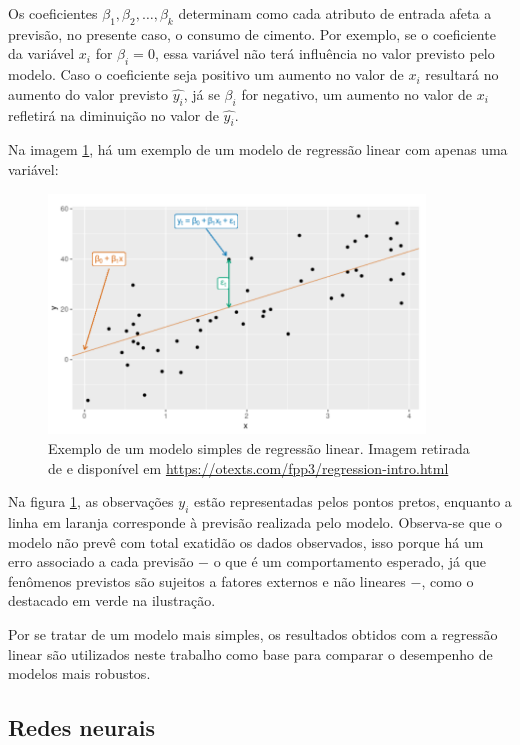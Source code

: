 Os coeficientes $\beta_1, \beta_2, \dots, \beta_k$ 
determinam como cada atributo de entrada afeta a previsão, no presente caso, o consumo de cimento.
Por exemplo, se o coeficiente da variável $x_i$ for $\beta_i = 0$,
essa variável não terá influência no valor previsto pelo modelo. 
Caso o coeficiente seja positivo um aumento 
no valor de $x_i$ resultará no aumento do valor previsto $\hat{y_i}$,
já se $\beta_i$ for negativo, um aumento no valor de $x_i$  refletirá na 
diminuição no valor de $\hat{y_i}$. 


Na imagem \ref{fig:reg_lin}, há um exemplo de um modelo de regressão 
linear com apenas uma variável:

\begin{figure}[H] 
  \includegraphics[width= 10cm]{../figuras/reg_lin.png}
  \caption{Exemplo de um modelo simples de regressão linear. Imagem retirada de \citet{forecasting} e disponível em \url{https://otexts.com/fpp3/regression-intro.html}}
  \label{fig:reg_lin}
\end{figure}

Na  figura \ref{fig:reg_lin}, as observações $y_i$ estão 
representadas pelos pontos pretos, enquanto a linha em laranja
corresponde à previsão realizada pelo modelo. Observa-se que
o modelo não prevê com total exatidão os dados observados, isso porque há 
um erro associado a cada previsão $-$ o que é um comportamento esperado, já que fenômenos previstos são 
sujeitos a fatores externos e não lineares $-$, como o destacado em verde 
na ilustração.


Por se tratar de um modelo mais simples, os resultados obtidos
com a regressão linear são utilizados neste trabalho como base 
para comparar o desempenho de modelos mais robustos.

\subsection{Redes neurais}

